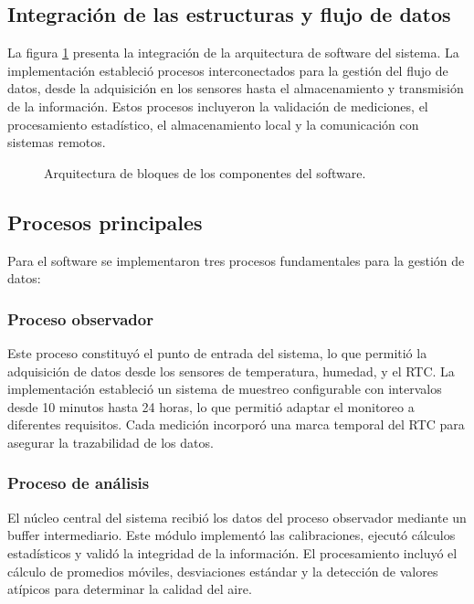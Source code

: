 \subsection{Integración de las estructuras y flujo de datos}

La figura \ref{fig:diagpatrones} presenta la integración de la arquitectura de software del sistema. La implementación estableció procesos interconectados para la gestión del flujo de datos, desde la adquisición en los sensores hasta el almacenamiento y transmisión de la información. Estos procesos incluyeron la validación de mediciones, el procesamiento estadístico, el almacenamiento local y la comunicación con sistemas remotos.

\begin{figure}[htpb]
	\centering
	\footnotesize
	
	\caption{Arquitectura de bloques de los componentes del software.}
	\label{fig:diagpatrones}
\end{figure}


\subsection{Procesos principales}
Para el software se implementaron tres procesos fundamentales para la gestión de datos:

\subsubsection{Proceso observador}

Este proceso constituyó el punto de entrada del sistema, lo que permitió la adquisición de datos desde los sensores de temperatura, humedad, \MPF y el RTC. La implementación estableció un sistema de muestreo configurable con intervalos desde 10 minutos hasta 24 horas, lo que permitió adaptar el monitoreo a diferentes requisitos. Cada medición incorporó una marca temporal del RTC para asegurar la trazabilidad de los datos.

\subsubsection{Proceso de análisis}

El núcleo central del sistema recibió los datos del proceso observador mediante un buffer intermediario. Este módulo implementó las calibraciones, ejecutó cálculos estadísticos y validó la integridad de la información. El procesamiento incluyó el cálculo de promedios móviles, desviaciones estándar y la detección de valores atípicos para determinar la calidad del aire.

